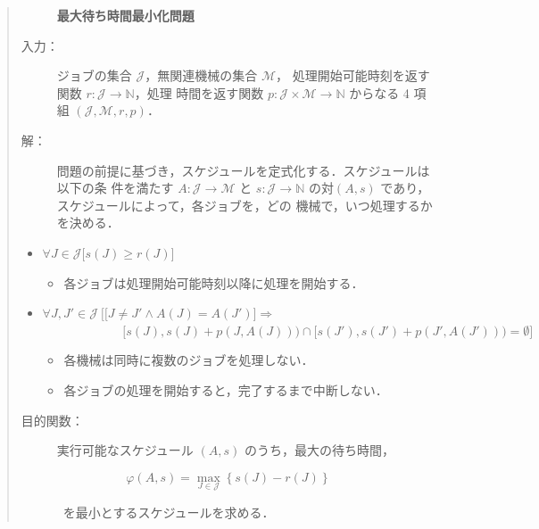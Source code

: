 \documentclass[12pt]{optlab-bachelor}
\begin{document}
\begin{quote}
  \begin{description}
    \item[] {\bf 最大待ち時間最小化問題}
    \item[入力：]
    ジョブの集合 $\mathcal{J}$，無関連機械の集合 $\mathcal{M}$，
    処理開始可能時刻を返す関数 $r : \mathcal{J} \to \mathbb{N}$，処理
    時間を返す関数 $p : \mathcal{J} \times \mathcal{M} \to \mathbb{N}$
    からなる 4 項組 $(\mathcal{J}, \mathcal{M}, r, p)$．
    \item[解：] 問題の前提に基づき，スケジュールを定式化する．スケジュールは以下の条
    件を満たす $A : \mathcal{J} \to \mathcal{M}$ と $s : \mathcal{J} \to
    \mathbb{N}$ の対$(A,s)$ であり，スケジュールによって，各ジョブを，どの
    機械で，いつ処理するかを決める．
  \end{description}

  \begin{itemize}
    \item $\forall J \in \mathcal{J}\big[s(J) \ge r(J) \big]$
    \begin{itemize}
      \item 各ジョブは処理開始可能時刻以降に処理を開始する．
    \end{itemize}

    \item $\forall J, J' \in \mathcal{J}\ \Big[ \big[J\ne J' \land A(J) = A(J')\big] \Rightarrow$ \\ $~~~~~~~~~~~~~~~~~~~~~~~~~~~~~[s(J), s(J)+p(J,A(J))) \cap[s(J'), s(J')+p(J', A(J'))) = \emptyset \Big]$
    \begin{itemize}
      \item 各機械は同時に複数のジョブを処理しない．
      \item 各ジョブの処理を開始すると，完了するまで中断しない．
    \end{itemize}
  \end{itemize}

  \begin{description}
    \item[目的関数：] 実行可能なスケジュール $(A,s)$ のうち，最大の待ち時間，
  \end{description}
  \begin{displaymath}
    \varphi(A,s) = \max_{J \in \mathcal{J}} \left\{s(J) -
    r(J)\right\}
  \end{displaymath}
  \begin{description}
    \item[] ~を最小とするスケジュールを求める．
  \end{description}
\end{quote}
\end{document}
